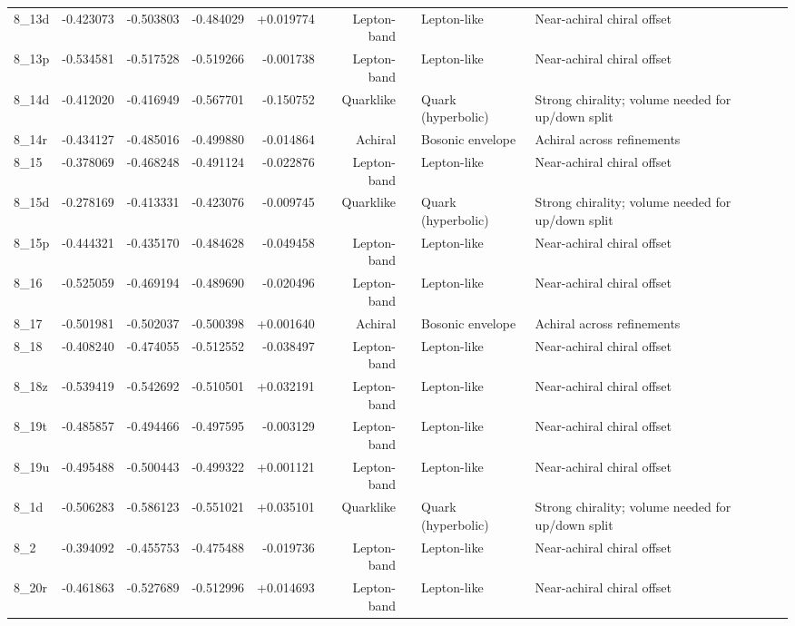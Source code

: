 \documentclass[smallextended]{svjour3}       %
\begin{document}
\begin{longtable}{lrrrrrllp{6.8cm}}
    8\_13d & -0.423073 & -0.503803 & -0.484029 & +0.019774 & Lepton-band &  & Lepton-like & Near-achiral chiral offset \\
    8\_13p & -0.534581 & -0.517528 & -0.519266 & -0.001738 & Lepton-band &  & Lepton-like & Near-achiral chiral offset \\
    8\_14d & -0.412020 & -0.416949 & -0.567701 & -0.150752 & Quarklike &  & Quark (hyperbolic) & Strong chirality; volume needed for up/down split \\
    8\_14r & -0.434127 & -0.485016 & -0.499880 & -0.014864 & Achiral &  & Bosonic envelope & Achiral across refinements \\
    8\_15 & -0.378069 & -0.468248 & -0.491124 & -0.022876 & Lepton-band &  & Lepton-like & Near-achiral chiral offset \\
    8\_15d & -0.278169 & -0.413331 & -0.423076 & -0.009745 & Quarklike &  & Quark (hyperbolic) & Strong chirality; volume needed for up/down split \\
    8\_15p & -0.444321 & -0.435170 & -0.484628 & -0.049458 & Lepton-band &  & Lepton-like & Near-achiral chiral offset \\
    8\_16 & -0.525059 & -0.469194 & -0.489690 & -0.020496 & Lepton-band &  & Lepton-like & Near-achiral chiral offset \\
    8\_17 & -0.501981 & -0.502037 & -0.500398 & +0.001640 & Achiral &  & Bosonic envelope & Achiral across refinements \\
    8\_18 & -0.408240 & -0.474055 & -0.512552 & -0.038497 & Lepton-band &  & Lepton-like & Near-achiral chiral offset \\
    8\_18z & -0.539419 & -0.542692 & -0.510501 & +0.032191 & Lepton-band &  & Lepton-like & Near-achiral chiral offset \\
    8\_19t & -0.485857 & -0.494466 & -0.497595 & -0.003129 & Lepton-band &  & Lepton-like & Near-achiral chiral offset \\
    8\_19u & -0.495488 & -0.500443 & -0.499322 & +0.001121 & Lepton-band &  & Lepton-like & Near-achiral chiral offset \\
    8\_1d & -0.506283 & -0.586123 & -0.551021 & +0.035101 & Quarklike &  & Quark (hyperbolic) & Strong chirality; volume needed for up/down split \\
    8\_2 & -0.394092 & -0.455753 & -0.475488 & -0.019736 & Lepton-band &  & Lepton-like & Near-achiral chiral offset \\
    8\_20r & -0.461863 & -0.527689 & -0.512996 & +0.014693 & Lepton-band &  & Lepton-like & Near-achiral chiral offset \\

\end{longtable}
\end{document}
